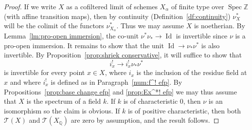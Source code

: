 \documentclass[11pt]{article}
\numberwithin{equation}{section}\renewcommand{\encodingdefault}{TU}
\newcommand{\T}{\mathscr T}
\DeclareMathOperator{\Id}{Id}
\DeclareMathOperator{\spec}{Spec}
\newcommand{\ZZ} {\mathbb Z}
\newcommand{\QQ} {\mathbb Q}
\theoremstyle{remark}
\theoremstyle{definition}
\numberwithin{equation}{thm}
\begin{document}
\begin{proof}
If we write $X$ as a cofiltered limit of schemes $X_\alpha$ of finite type over $\spec{\ZZ}$ (with affine transition maps), then by continuity (Definition~\ref{df:continuity}) $\nu_X^*$ will be the colimit of the functors $\nu_{X_\alpha}^*$.
Thus we may assume $X$ is noetherian.
By Lemma~\ref{lm:pro-open immersion}, the co-unit $\nu^*\nu_* \to \Id$ is invertible since $\nu$ is a pro-open immersion.
It remains to show that the unit $\Id \to \nu_*\nu^*$ is also invertible.
By Proposition~\ref{prop:shriek conservative}, it will suffice to show that
\[
i_x^! \to i_x^!\nu_*\nu^*
\]
is invertible for every point $x \in X$, where $i_x$ is the inclusion of the residue field at $x$ and where $i_x^!$ is defined as in Paragraph~\ref{num:f^! efp}.
By Propositions~\ref{prop:base change efp} and \ref{prop:Ex^*! efp} we may thus assume that $X$ is the spectrum of a field $k$.
If $k$ is of characteristic $0$, then $\nu$ is an isomorphism so the claim is obvious.
If $k$ is of positive characteristic, then both $\T(X)$ and $\T(X_\QQ)$ are zero by assumption, and the result follows.
\end{proof}
\end{document}
